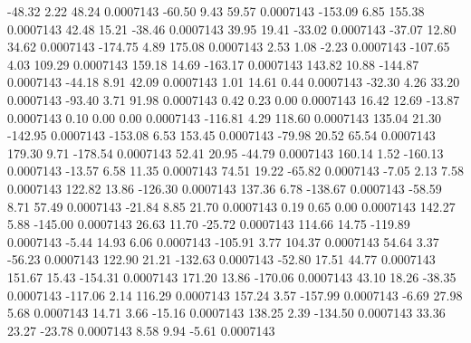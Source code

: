       -48.32        2.22       48.24     0.0007143
      -60.50        9.43       59.57     0.0007143
     -153.09        6.85      155.38     0.0007143
       42.48       15.21      -38.46     0.0007143
       39.95       19.41      -33.02     0.0007143
      -37.07       12.80       34.62     0.0007143
     -174.75        4.89      175.08     0.0007143
        2.53        1.08       -2.23     0.0007143
     -107.65        4.03      109.29     0.0007143
      159.18       14.69     -163.17     0.0007143
      143.82       10.88     -144.87     0.0007143
      -44.18        8.91       42.09     0.0007143
        1.01       14.61        0.44     0.0007143
      -32.30        4.26       33.20     0.0007143
      -93.40        3.71       91.98     0.0007143
        0.42        0.23        0.00     0.0007143
       16.42       12.69      -13.87     0.0007143
        0.10        0.00        0.00     0.0007143
     -116.81        4.29      118.60     0.0007143
      135.04       21.30     -142.95     0.0007143
     -153.08        6.53      153.45     0.0007143
      -79.98       20.52       65.54     0.0007143
      179.30        9.71     -178.54     0.0007143
       52.41       20.95      -44.79     0.0007143
      160.14        1.52     -160.13     0.0007143
      -13.57        6.58       11.35     0.0007143
       74.51       19.22      -65.82     0.0007143
       -7.05        2.13        7.58     0.0007143
      122.82       13.86     -126.30     0.0007143
      137.36        6.78     -138.67     0.0007143
      -58.59        8.71       57.49     0.0007143
      -21.84        8.85       21.70     0.0007143
        0.19        0.65        0.00     0.0007143
      142.27        5.88     -145.00     0.0007143
       26.63       11.70      -25.72     0.0007143
      114.66       14.75     -119.89     0.0007143
       -5.44       14.93        6.06     0.0007143
     -105.91        3.77      104.37     0.0007143
       54.64        3.37      -56.23     0.0007143
      122.90       21.21     -132.63     0.0007143
      -52.80       17.51       44.77     0.0007143
      151.67       15.43     -154.31     0.0007143
      171.20       13.86     -170.06     0.0007143
       43.10       18.26      -38.35     0.0007143
     -117.06        2.14      116.29     0.0007143
      157.24        3.57     -157.99     0.0007143
       -6.69       27.98        5.68     0.0007143
       14.71        3.66      -15.16     0.0007143
      138.25        2.39     -134.50     0.0007143
       33.36       23.27      -23.78     0.0007143
        8.58        9.94       -5.61     0.0007143
